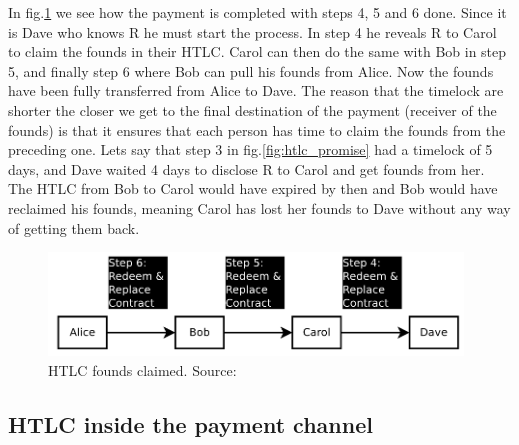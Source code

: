 In fig.\ref{fig:htlc_settle} we see how the payment is completed with steps 4, 5 and 6 done. Since it is Dave who knows R he must start the process. In step 4 he reveals R to Carol to claim the founds in their HTLC. Carol can then do the same with Bob in step 5, and finally step 6 where Bob can pull his founds from Alice.
Now the founds have been fully transferred from Alice to Dave.
The reason that the timelock are shorter the closer we get to the final destination of the payment (receiver of the founds) is that it ensures that each person has time to claim the founds from the preceding one. Lets say that step 3 in fig.\ref{fig:htlc_promise} had a timelock of 5 days, and Dave waited 4 days to disclose R to Carol and get founds from her. The HTLC from Bob to Carol would have expired by then and Bob would have reclaimed his founds, meaning Carol has lost her founds to Dave without any way of getting them back.

\begin{figure}[h]
    \centering
    \includegraphics[width=11cm]{figures/htlc_settle.png}
    \caption{HTLC founds claimed. Source: \cite{poon2015bitcoin}}
    \label{fig:htlc_settle}
\end{figure}


\subsection{HTLC inside the payment channel}
\label{subsec:htlcln}

